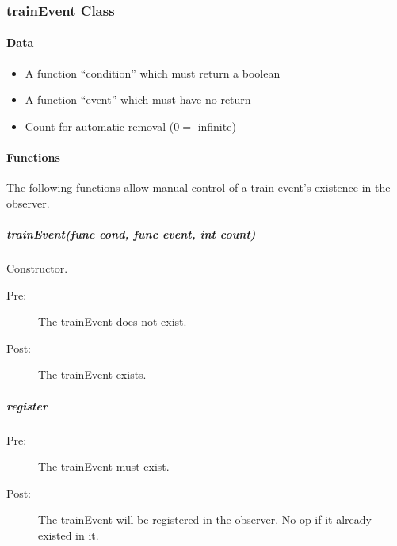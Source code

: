 \documentclass[a4paper,11pt,notitlepage]{article}
\begin{document}
\subsubsection{trainEvent Class}
\paragraph{Data}
\begin{itemize}
\item A function ``condition'' which must return a boolean
\item A function ``event'' which must have no return
\item Count for automatic removal ($0 =$ infinite)
\end{itemize}
\paragraph{Functions}
The following functions allow manual control of a train event's existence in the observer.
\subparagraph{trainEvent(func cond, func event, int count)} Constructor.
\begin{description}
\item[\hspace{1cm}Pre:] The trainEvent does not exist.
\item[\hspace{1cm}Post:] The trainEvent exists.
\end{description}
\subparagraph{register}
\begin{description}
\item[\hspace{1cm}Pre:] The trainEvent must exist.
\item[\hspace{1cm}Post:] The trainEvent will be registered in the observer. No op if it already existed in it.
\end{description}
\end{document}
